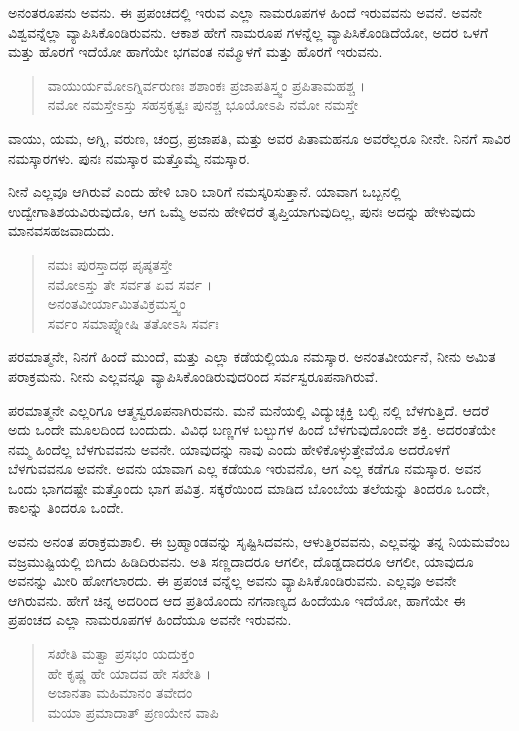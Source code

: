 ಅನಂತರೂಪನು ಅವನು. ಈ ಪ್ರಪಂಚದಲ್ಲಿ ಇರುವ ಎಲ್ಲಾ ನಾಮರೂಪಗಳ ಹಿಂದೆ ಇರುವವನು ಅವನೆ. ಅವನೇ ವಿಶ್ವವನ್ನೆಲ್ಲಾ ವ್ಯಾಪಿಸಿಕೊಂಡಿರುವನು. ಆಕಾಶ ಹೇಗೆ ನಾಮರೂಪ ಗಳನ್ನೆಲ್ಲ ವ್ಯಾಪಿಸಿಕೊಂಡಿದೆಯೋ, ಅದರ ಒಳಗೆ ಮತ್ತು ಹೊರಗೆ ಇದೆಯೋ ಹಾಗೆಯೇ ಭಗವಂತ ನಮ್ಮೊಳಗೆ ಮತ್ತು ಹೊರಗೆ ಇರುವನು.

\begin{verse}
ವಾಯುರ್ಯಮೋಽಗ್ನಿರ್ವರುಣಃ ಶಶಾಂಕಃ ಪ್ರಜಾಪತಿಸ್ತ್ವಂ ಪ್ರಪಿತಾಮಹಶ್ಚ ।\\ನಮೋ ನಮಸ್ತೇಽಸ್ತು ಸಹಸ್ರಕೃತ್ವಃ ಪುನಶ್ಚ ಭೂಯೋಽಪಿ ನಮೋ ನಮಸ್ತೇ 
\end{verse}

{\small ವಾಯು, ಯಮ, ಅಗ್ನಿ, ವರುಣ, ಚಂದ್ರ, ಪ್ರಜಾಪತಿ, ಮತ್ತು ಅವರ ಪಿತಾಮಹನೂ ಅವರೆಲ್ಲರೂ ನೀನೇ. ನಿನಗೆ ಸಾವಿರ ನಮಸ್ಕಾರಗಳು. ಪುನಃ ನಮಸ್ಕಾರ ಮತ್ತೊಮ್ಮೆ ನಮಸ್ಕಾರ.}

ನೀನೆ ಎಲ್ಲವೂ ಆಗಿರುವೆ ಎಂದು ಹೇಳಿ ಬಾರಿ ಬಾರಿಗೆ ನಮಸ್ಕರಿಸುತ್ತಾನೆ. ಯಾವಾಗ ಒಬ್ಬನಲ್ಲಿ ಉದ್ವೇಗಾತಿಶಯವಿರುವುದೊ, ಆಗ ಒಮ್ಮೆ ಅವನು ಹೇಳಿದರೆ ತೃಪ್ತಿಯಾಗುವುದಿಲ್ಲ, ಪುನಃ ಅದನ್ನು ಹೇಳುವುದು ಮಾನವಸಹಜವಾದುದು.

\begin{verse}
ನಮಃ ಪುರಸ್ತಾದಥ ಪೃಷ್ಠತಸ್ತೇ \\ ನಮೋಽಸ್ತು ತೇ ಸರ್ವತ ಏವ ಸರ್ವ ।\\ ಅನಂತವೀರ್ಯಾಮಿತವಿಕ್ರಮಸ್ತ್ವಂ \\ ಸರ್ವಂ ಸಮಾಪ್ನೋಷಿ ತತೋಽಸಿ ಸರ್ವಃ 
\end{verse}

{\small ಪರಮಾತ್ಮನೇ, ನಿನಗೆ ಹಿಂದೆ ಮುಂದೆ, ಮತ್ತು ಎಲ್ಲಾ ಕಡೆಯಲ್ಲಿಯೂ ನಮಸ್ಕಾರ. ಅನಂತವೀರ್ಯನೆ, ನೀನು ಅಮಿತ ಪರಾಕ್ರಮನು. ನೀನು ಎಲ್ಲವನ್ನೂ ವ್ಯಾಪಿಸಿಕೊಂಡಿರುವುದರಿಂದ ಸರ್ವಸ್ವರೂಪನಾಗಿರುವೆ.}

ಪರಮಾತ್ಮನೇ ಎಲ್ಲರಿಗೂ ಆತ್ಮಸ್ವರೂಪನಾಗಿರುವನು. ಮನೆ ಮನೆಯಲ್ಲಿ ವಿದ್ಯುಚ್ಛಕ್ತಿ ಬಲ್ಬಿ ನಲ್ಲಿ ಬೆಳಗುತ್ತಿದೆ. ಆದರೆ ಅದು ಒಂದೇ ಮೂಲದಿಂದ ಬಂದುದು. ವಿವಿಧ ಬಣ್ಣಗಳ ಬಲ್ಬುಗಳ ಹಿಂದೆ ಬೆಳಗುವುದೊಂದೇ ಶಕ್ತಿ. ಅದರಂತೆಯೇ ನಮ್ಮ ಹಿಂದೆಲ್ಲ ಬೆಳಗುವವನು ಅವನೇ. ಯಾವುದನ್ನು ನಾವು ಎಂದು ಹೇಳಿಕೊಳ್ಳುತ್ತೇವೆಯೊ ಅದರೊಳಗೆ ಬೆಳಗುವವನೂ ಅವನೇ. ಅವನು ಯಾವಾಗ ಎಲ್ಲ ಕಡೆಯೂ ಇರುವನೊ, ಆಗ ಎಲ್ಲ ಕಡೆಗೂ ನಮಸ್ಕಾರ. ಅವನ ಒಂದು ಭಾಗದಷ್ಟೇ ಮತ್ತೊಂದು ಭಾಗ ಪವಿತ್ರ. ಸಕ್ಕರೆಯಿಂದ ಮಾಡಿದ ಬೊಂಬೆಯ ತಲೆಯನ್ನು ತಿಂದರೂ ಒಂದೇ, ಕಾಲನ್ನು ತಿಂದರೂ ಒಂದೇ.

ಅವನು ಅನಂತ ಪರಾಕ್ರಮಶಾಲಿ. ಈ ಬ್ರಹ್ಮಾಂಡವನ್ನು ಸೃಷ್ಟಿಸಿದವನು, ಆಳುತ್ತಿರವವನು, ಎಲ್ಲವನ್ನು ತನ್ನ ನಿಯಮವೆಂಬ ವಜ್ರಮುಷ್ಟಿಯಲ್ಲಿ ಬಿಗಿದು ಹಿಡಿದಿರುವನು. ಅತಿ ಸಣ್ಣದಾದರೂ ಆಗಲೀ, ದೊಡ್ಡದಾದರೂ ಆಗಲೀ, ಯಾವುದೂ ಅವನನ್ನು ಮೀರಿ ಹೋಗಲಾರದು. ಈ ಪ್ರಪಂಚ ವನ್ನೆಲ್ಲ ಅವನು ವ್ಯಾಪಿಸಿಕೊಂಡಿರುವನು. ಎಲ್ಲವೂ ಅವನೇ ಆಗಿರುವನು. ಹೇಗೆ ಚಿನ್ನ ಅದರಿಂದ ಆದ ಪ್ರತಿಯೊಂದು ನಗನಾಣ್ಯದ ಹಿಂದೆಯೂ ಇದೆಯೋ, ಹಾಗೆಯೇ ಈ ಪ್ರಪಂಚದ ಎಲ್ಲಾ ನಾಮರೂಪಗಳ ಹಿಂದೆಯೂ ಅವನೇ ಇರುವನು.

\begin{verse}
ಸಖೇತಿ ಮತ್ವಾ ಪ್ರಸಭಂ ಯದುಕ್ತಂ \\ ಹೇ ಕೃಷ್ಣ ಹೇ ಯಾದವ ಹೇ ಸಖೇತಿ ।\\ಅಜಾನತಾ ಮಹಿಮಾನಂ ತವೇದಂ \\ ಮಯಾ ಪ್ರಮಾದಾತ್ ಪ್ರಣಯೇನ ವಾಪಿ 
\end{verse}

